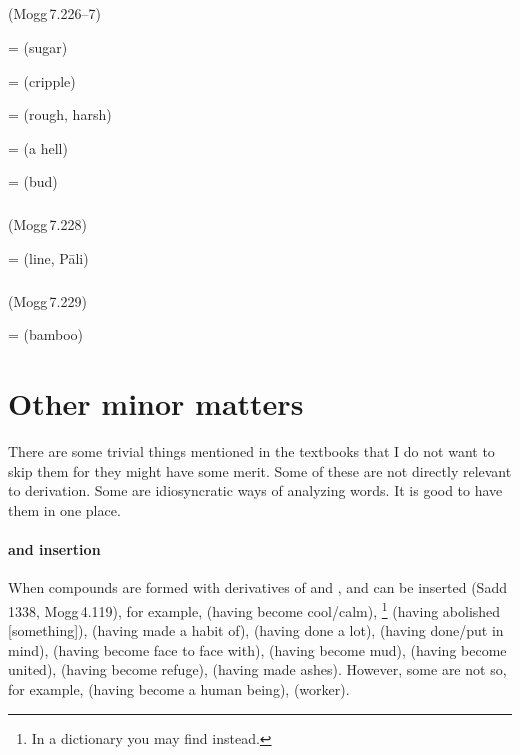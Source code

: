 \subparagraph*{} (Mogg\,7.226--7)\label{pacckx:dlaka}

 =  (sugar)\par
{} =  (cripple)\par
{} =  (rough, harsh)\par
{} =  (a hell)\par
{} =  (bud)\par

\subparagraph*{} (Mogg\,7.228)\label{pacckx:dli}

 =  (line, P\=ali)\par

\subparagraph*{} (Mogg\,7.229)\label{pacckx:dlu}

 =  (bamboo)\par

\section*{Other minor matters}

There are some trivial things mentioned in the textbooks that I do not want to skip them for they might have some merit. Some of these are not directly relevant to derivation. Some are idiosyncratic ways of analyzing words. It is good to have them in one place.

\paragraph*{ and  insertion} When compounds are formed with derivatives of  and ,  and  can be inserted (Sadd\,1338, Mogg\,4.119), for example,  (having become cool/calm), \footnote{In a dictionary you may find  instead.} (having abolished [something]),  (having made a habit of),  (having done a lot),  (having done/put in mind),  (having become face to face with),  (having become mud),  (having become united),  (having become refuge),  (having made ashes). However, some are not so, for example,  (having become a human being),  (worker).

